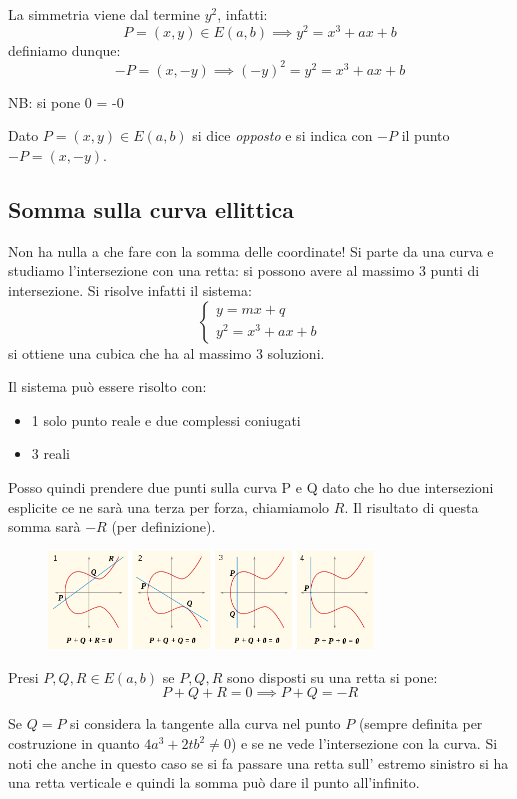 La simmetria viene dal termine $y^2$, infatti:
$$ P = (x,y) \in E(a,b) \implies y^2 = x^3 + ax + b $$
definiamo dunque:
$$ -P = (x,-y) \implies (-y)^2 = y^2 = x^3 + ax + b $$

NB: si pone 0 = -0

Dato $P=(x,y) \in E(a,b) $ si dice \emph{opposto} e si indica con $-P$ il punto $-P=(x,-y)$.

\subsection{Somma sulla curva ellittica}
Non ha nulla a che fare con la somma delle coordinate!
Si parte da una curva e studiamo l'intersezione con una retta: si possono avere al massimo 3 punti di intersezione.
Si risolve infatti il sistema:
\begin{equation}
    \begin{cases}
    y = mx + q \\
    y^2 = x^3 + ax + b
    \end{cases}
\end{equation}
si ottiene una cubica che ha al massimo 3 soluzioni.

Il sistema può essere risolto con:
\begin{itemize}
    \item 1 solo punto reale e due complessi coniugati
    \item 3 reali
\end{itemize}

Posso quindi prendere due punti sulla curva P e Q dato che ho due intersezioni esplicite ce ne sarà una terza per forza, chiamiamolo $R$. Il risultato di questa somma sarà $-R$ (per definizione).

\begin{figure}[H]
    \centering
    \includegraphics[width=325px]{ECC_2.png}
\end{figure}

Presi $P, Q, R \in E(a,b)$ se $P, Q, R$ sono disposti su una retta si pone:
$$ P + Q + R = 0 \implies P + Q = -R $$

Se $Q = P$ si considera la tangente alla curva nel punto $P$ (sempre definita per costruzione in quanto $4a^3+2tb^2 \neq 0$) e se ne vede l'intersezione con la curva.
Si noti che anche in questo caso se si fa passare una retta sull' estremo sinistro si ha una retta verticale e quindi la somma può dare il punto all'infinito.

